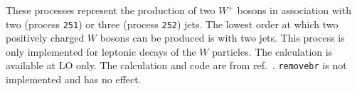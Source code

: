 These processes represent the production of two $W^+$
bosons in association with two (process {\tt 251}) or three (process {\tt 252})
jets.  The lowest order at which two positively charged $W$ bosons
can be produced is with two jets.
This process is only implemented for leptonic decays of the
$W$ particles. The calculation is available at LO only.
The calculation and code are from ref.~\cite{Melia:2010bm}.
{\tt removebr} is not implemented and has no effect.
